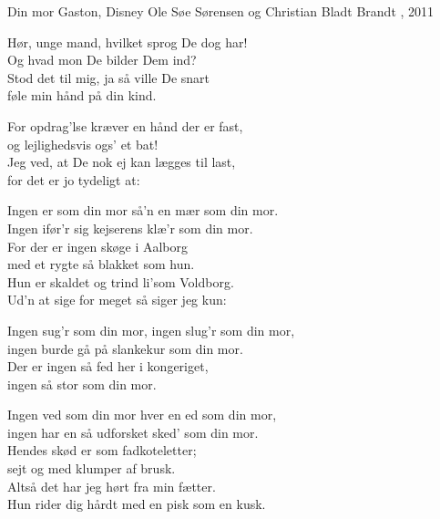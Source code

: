 \begin{song}{Din mor}
  {} %
  {Gaston, Disney} %
  {Ole Søe Sørensen og Christian Bladt Brandt} %
  {\TKET{}, 2011} %
  {\NotCCLIed} %

  \begin{SBSection*}
    Hør, unge mand, hvilket sprog De dog har!\\
    Og hvad mon De bilder Dem ind?\\
    Stod det til mig, ja så ville De snart\\
    føle min hånd på din kind.
  \end{SBSection*}

  \begin{SBSection*}
    For opdrag’lse kræver en hånd der er fast,\\
    og lejlighedsvis ogs’ et bat!\\
    Jeg ved, at De nok ej kan lægges til last,\\
    for det er jo tydeligt at:
  \end{SBSection*}

  \begin{SBVerse}
    Ingen er som din mor så’n en mær som din mor.\\
    Ingen ifør’r sig kejserens klæ’r som din mor.\\
    For der er ingen skøge i Aalborg\\
    med et rygte så blakket som hun.\\
    Hun er skaldet og trind li’som Voldborg.\\
    Ud’n at sige for meget så siger jeg kun:
  \end{SBVerse}

  \begin{SBVerse}
    Ingen sug’r som din mor, ingen slug’r som din mor,\\
    ingen burde gå på slankekur som din mor.\\
    Der er ingen så fed her i kongeriget,\\
    ingen så stor som din mor.
  \end{SBVerse}

  \begin{SBVerse}
    Ingen ved som din mor hver en ed som din mor,\\
    ingen har en så udforsket sked’ som din mor.\\
    Hendes skød er som fadkoteletter;\\
    sejt og med klumper af brusk.\\
    Altså det har jeg hørt fra min fætter.\\
    Hun rider dig hårdt med en pisk som en kusk.
  \end{SBVerse}


\end{song}
